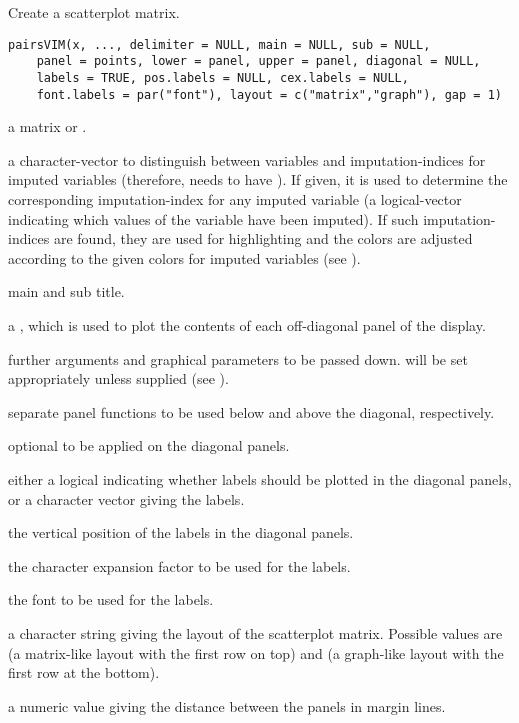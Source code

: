 %
\begin{Description}\relax
Create a scatterplot matrix.
\end{Description}
%
\begin{Usage}
\begin{verbatim}
pairsVIM(x, ..., delimiter = NULL, main = NULL, sub = NULL,
    panel = points, lower = panel, upper = panel, diagonal = NULL,
    labels = TRUE, pos.labels = NULL, cex.labels = NULL,
    font.labels = par("font"), layout = c("matrix","graph"), gap = 1)
\end{verbatim}
\end{Usage}
%
\begin{Arguments}
\begin{ldescription}
\item[\code{x}] a matrix or .
\item[\code{delimiter}] a character-vector to distinguish between variables
and imputation-indices for imputed variables (therefore,  needs
to have ). If given, it is used to determine the corresponding
imputation-index for any imputed variable (a logical-vector indicating
which values of the variable have been imputed). If such imputation-indices
are found, they are used for highlighting and the colors are adjusted 
according to the given colors for imputed variables (see ).
\item[\code{main, sub}] main and sub title.
\item[\code{panel}] a , which is used to plot
the contents of each off-diagonal panel of the display.
\item[\code{...}] further arguments and graphical parameters to be passed 
down.   will be set appropriately unless supplied 
(see ).
\item[\code{lower, upper}] separate panel functions to be used below and above 
the diagonal, respectively.
\item[\code{diagonal}] optional  to be
applied on the diagonal panels.
\item[\code{labels}] either a logical indicating whether labels should be 
plotted in the diagonal panels, or a character vector giving 
the labels.
\item[\code{pos.labels}] the vertical position of the labels in the diagonal 
panels.
\item[\code{cex.labels}] the character expansion factor to be used for the 
labels.
\item[\code{font.labels}] the font to be used for the labels.
\item[\code{layout}] a character string giving the layout of the scatterplot 
matrix.  Possible values are  (a matrix-like layout 
with the first row on top) and  (a graph-like layout 
with the first row at the bottom).
\item[\code{gap}] a numeric value giving the distance between the panels in 
margin lines.
\end{ldescription}
\end{Arguments}

